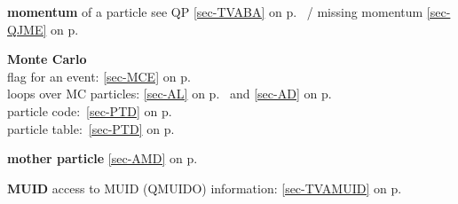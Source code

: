  \item{\bf momentum    }of a particle see QP \ref{sec-TVABA} on p.~\pageref{sec-TVABA} /
 missing momentum \ref{sec-QJME} on p.~\pageref{sec-QJME}\\
 \item{\bf Monte Carlo }\\
 \subitem flag for an event: \ref{sec-MCE} on p.~\pageref{sec-MCE}\\
 \subitem loops over MC particles: \ref{sec-AL} on p.~\pageref{sec-AL} and
 \ref{sec-AD} on p.~\pageref{sec-AD}\\
 \subitem particle code:~\ref{sec-PTD} on p.~\pageref{sec-PTD}\\
 \subitem particle table:~\ref{sec-PTD} on p.~\pageref{sec-PTD}\\
 \item{\bf mother particle }\ref{sec-AMD} on p.~\pageref{sec-AMD}\\
 \item{\bf MUID    }access to MUID (QMUIDO)
 information: \ref{sec-TVAMUID} on p.~\pageref{sec-TVAMUID}
 
